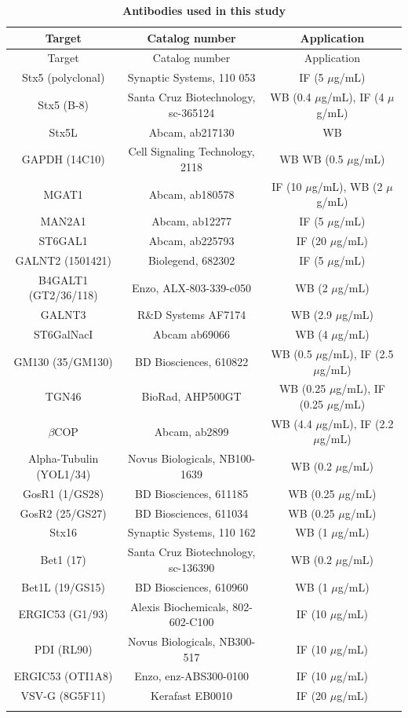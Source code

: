 \footnotesize
\begin{longtable}[c]{c c c}
    \caption{\textbf{Antibodies used in this study}} \\
    Target & Catalog number & Application \\
    \hline
    \endfirsthead
    Target & Catalog number & Application \\
    \hline
    \endhead
    Stx5 (polyclonal) & Synaptic Systems, 110 053 & IF (5 $\mu$g/mL) \\
    Stx5 (B-8) & Santa Cruz Biotechnology, sc-365124 & WB (0.4 $\mu$g/mL), IF (4 $\mu$g/mL) \\
    Stx5L & Abcam, ab217130 & WB \\
    GAPDH (14C10) & Cell Signaling Technology, 2118 & WB WB (0.5 $\mu$g/mL) \\
    MGAT1 & Abcam, ab180578 & IF (10 $\mu$g/mL), WB (2 $\mu$g/mL) \\
    MAN2A1 & Abcam, ab12277 & IF (5 $\mu$g/mL) \\
    ST6GAL1 & Abcam, ab225793 & IF (20 $\mu$g/mL) \\
    GALNT2 (1501421) & Biolegend, 682302 & IF (5 $\mu$g/mL) \\
    B4GALT1 (GT2/36/118) & Enzo, ALX-803-339-c050 & WB (2 $\mu$g/mL) \\
    GALNT3 & R\&D Systems AF7174 & WB (2.9 $\mu$g/mL) \\
    ST6GalNacI & Abcam ab69066  & WB (4 $\mu$g/mL) \\
    GM130 (35/GM130) & BD Biosciences, 610822 & WB (0.5 $\mu$g/mL), IF (2.5 $\mu$g/mL) \\
    TGN46 & BioRad, AHP500GT & WB (0.25 $\mu$g/mL), IF (0.25 $\mu$g/mL) \\
    $\beta$COP & Abcam, ab2899 & WB (4.4 $\mu$g/mL), IF (2.2 $\mu$g/mL) \\
    Alpha-Tubulin (YOL1/34) & Novus Biologicals, NB100-1639 & WB (0.2 $\mu$g/mL) \\
    GosR1 (1/GS28) & BD Biosciences, 611185 & WB (0.25 $\mu$g/mL) \\
    GosR2 (25/GS27) & BD Biosciences, 611034 & WB (0.25 $\mu$g/mL) \\
    Stx16 & Synaptic Systems, 110 162 & WB (1 $\mu$g/mL) \\
    Bet1 (17) & Santa Cruz Biotechnology, sc-136390 & WB (0.2 $\mu$g/mL) \\
    Bet1L (19/GS15) & BD Biosciences, 610960 & WB (1 $\mu$g/mL) \\
    ERGIC53 (G1/93) & Alexis Biochemicals, 802-602-C100 & IF (10 $\mu$g/mL) \\
    PDI (RL90) & Novus Biologicals, NB300-517 & IF (10 $\mu$g/mL) \\
    ERGIC53 (OTI1A8) & Enzo, enz-ABS300-0100 & IF (10 $\mu$g/mL) \\
    VSV-G (8G5F11) & Kerafast EB0010 & IF (20 $\mu$g/mL) \\
    \label{tbl:ch6tbl6}
\end{longtable}
\normalsize